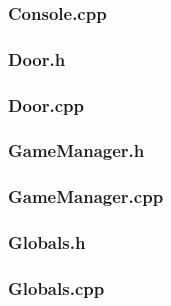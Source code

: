 \documentclass{article}
\begin{document}
\subsubsection{Console.cpp}
	
					
\subsubsection{Door.h}
	

\subsubsection{Door.cpp}
	
 				
\subsubsection{GameManager.h}
	

\subsubsection{GameManager.cpp}
	
	 				
\subsubsection{Globals.h}
	 
	 				
\subsubsection{Globals.cpp}
	 
	 				
\end{document}
